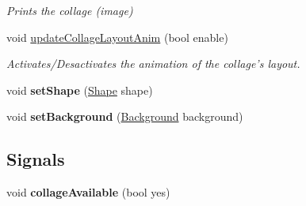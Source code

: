 \begin{DoxyCompactItemize}
\begin{DoxyCompactList}\small\item\em Prints the collage (image) \item\end{DoxyCompactList}\item 
\hypertarget{class_collage_creator_ab067ae84833dfdb945b3c69615d0247d}{
void \hyperlink{class_collage_creator_ab067ae84833dfdb945b3c69615d0247d}{updateCollageLayoutAnim} (bool enable)}
\label{class_collage_creator_ab067ae84833dfdb945b3c69615d0247d}

\begin{DoxyCompactList}\small\item\em Activates/Desactivates the animation of the collage's layout. \item\end{DoxyCompactList}\item 
\hypertarget{class_collage_creator_a57ecc6f2b0221a28ea5fb403c7d53497}{
void {\bfseries setShape} (\hyperlink{class_collage_creator_aeb7a294ef28befb9567ccd6a6133bc1e}{Shape} shape)}
\label{class_collage_creator_a57ecc6f2b0221a28ea5fb403c7d53497}

\item 
\hypertarget{class_collage_creator_a0d1313570452d4b53e400db6e2df12f7}{
void {\bfseries setBackground} (\hyperlink{class_collage_creator_ad3349d041784e87b5d49625ad4107d39}{Background} background)}
\label{class_collage_creator_a0d1313570452d4b53e400db6e2df12f7}

\end{DoxyCompactItemize}
\subsection*{Signals}
\begin{DoxyCompactItemize}
\item 
\hypertarget{class_collage_creator_a855bb6652d08033355f87378a76e43c1}{
void {\bfseries collageAvailable} (bool yes)}
\label{class_collage_creator_a855bb6652d08033355f87378a76e43c1}

\end{DoxyCompactItemize}
